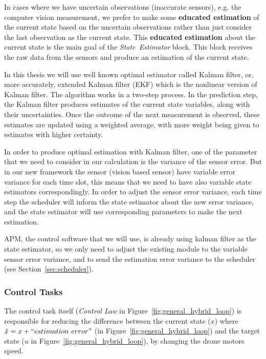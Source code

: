 \documentclass[11pt]{article}
\begin{document}
In cases where we have uncertain observations (inaccurate sensors), e.g. the computer vision measurement, we prefer to make some \textbf{educated estimation} of the current state based on the uncertain observations rather than just consider the last observation as the current state.
This \textbf{educated estimation} about the current state is the main goal of the \textit{State~Estimator} block.
This block receives the raw data from the sensors and produce an estimation of the current state.

In this thesis we will use well known optimal estimator called Kalman filter, or, more accurately, extended Kalman filter (EKF) which is the nonlinear version of Kalman filter.
The algorithm works in a two-step process. In the prediction step, the Kalman filter produces estimates of the current state variables, along with their uncertainties. Once the outcome of the next measurement is observed, these estimates are updated using a weighted average, with more weight being given to estimates with higher certainty.
\cite{Kalman-filter}

In order to produce optimal estimation with Kalman filter, one of the parameter that we need to consider in our calculation is the variance of the sensor error.
But in our new framework the sensor (vision based sensor) have variable error variance for each time slot, this means that we need to have also variable state estimators correspondingly.
In order to adjust the sensor error variance, each time step the scheduler will inform the state estimator about the new error variance, and the state estimator will use corresponding parameters to make the next estimation.

APM, the control software that we will use, is already using kalman filter as the state estimator, so we only need to adjust the existing module to the variable sensor error variance, and to send the estimation error variance to the scheduler (see Section~\ref{sec:scheduler}).

\subsubsection{Control Tasks} 
\label{sec:control}
The control task itself (\textit{Control Law} in Figure~\ref{fig:general_hybrid_loop}) is responsible for reducing the difference between the current state ($x$) where $\tilde{x} = x+ ``estimation~error"$ (in Figure~\ref{fig:general_hybrid_loop}) and the target state ($u$ in Figure~\ref{fig:general_hybrid_loop}), by changing the drone motors speed.
\end{document}
